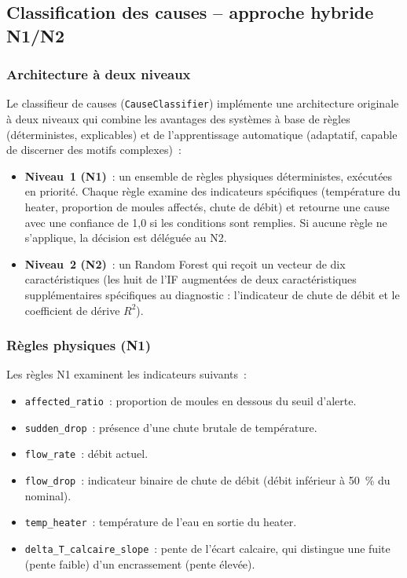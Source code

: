 \subsection{Classification des causes -- approche hybride N1/N2}

\subsubsection{Architecture à deux niveaux}

Le classifieur de causes (\texttt{CauseClassifier}) implémente une architecture originale à deux niveaux qui combine les avantages des systèmes à base de règles (déterministes, explicables) et de l'apprentissage automatique (adaptatif, capable de discerner des motifs complexes)~:

\begin{itemize}
  \item \textbf{Niveau~1 (N1)}~: un ensemble de règles physiques déterministes, exécutées en priorité. Chaque règle examine des indicateurs spécifiques (température du heater, proportion de moules affectés, chute de débit) et retourne une cause avec une confiance de 1,0 si les conditions sont remplies. Si aucune règle ne s'applique, la décision est déléguée au N2.
  \item \textbf{Niveau~2 (N2)}~: un Random Forest qui reçoit un vecteur de dix caractéristiques (les huit de l'IF augmentées de deux caractéristiques supplémentaires spécifiques au diagnostic : l'indicateur de chute de débit et le coefficient de dérive \(R^2\)).
\end{itemize}

\subsubsection{Règles physiques (N1)}

Les règles N1 examinent les indicateurs suivants~:

\begin{itemize}
  \item \texttt{affected\_ratio}~: proportion de moules en dessous du seuil d'alerte.
  \item \texttt{sudden\_drop}~: présence d'une chute brutale de température.
  \item \texttt{flow\_rate}~: débit actuel.
  \item \texttt{flow\_drop}~: indicateur binaire de chute de débit (débit inférieur à 50~\% du nominal).
  \item \texttt{temp\_heater}~: température de l'eau en sortie du heater.
  \item \texttt{delta\_T\_calcaire\_slope}~: pente de l'écart calcaire, qui distingue une fuite (pente faible) d'un encrassement (pente élevée).
\end{itemize}

